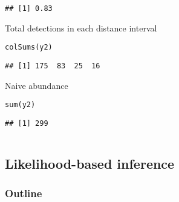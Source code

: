 \documentclass[color=usenames,dvipsnames]{beamer}\usepackage[]{graphicx}\usepackage[]{color}
\makeatletter
\newcommand{\hlstd}[1]{\textcolor[rgb]{0,0,0}{#1}}%
\newcommand{\hlkwd}[1]{\textcolor[rgb]{0.004,0.004,0.506}{#1}}%
\newenvironment{kframe}{%
 \def\at@end@of@kframe{}%
 \ifinner\ifhmode%
  \def\at@end@of@kframe{\end{minipage}}%
  \begin{minipage}{\columnwidth}%
 \fi\fi%
 \def\FrameCommand##1{\hskip\@totalleftmargin \hskip-\fboxsep
 \colorbox{shadecolor}{##1}\hskip-\fboxsep
     \hskip-\linewidth \hskip-\@totalleftmargin \hskip\columnwidth}%
 \MakeFramed {\advance\hsize-\width
   \@totalleftmargin\z@ \linewidth\hsize
   \@setminipage}}%
 {\par\unskip\endMakeFramed%
 \at@end@of@kframe}
\newenvironment{knitrout}{}{} %
\makeatother
\begin{document}
\begin{frame}[fragile]
\begin{columns}
\begin{column}{0.6\textwidth}
\begin{knitrout}
\begin{kframe}
\begin{verbatim}
## [1] 0.83
\end{verbatim}
\end{kframe}
\end{knitrout}
  \pause
  \vfill
  \small
  Total detections in each distance interval
  \vspace{-6pt}
\begin{knitrout}\scriptsize
{}\color{fgcolor}\begin{kframe}
\begin{alltt}
\hlkwd{colSums}\hlstd{(y2)}
\end{alltt}
\begin{verbatim}
## [1] 175  83  25  16
\end{verbatim}
\end{kframe}
\end{knitrout}
  \pause
  \vfill
  Naive abundance
  \vspace{-6pt}
\begin{knitrout}\scriptsize
{}\color{fgcolor}\begin{kframe}
\begin{alltt}
\hlkwd{sum}\hlstd{(y2)}
\end{alltt}
\begin{verbatim}
## [1] 299
\end{verbatim}
\end{kframe}
\end{knitrout}

  \end{column}
  \end{columns}
\end{frame}









\subsection{Likelihood-based inference}


\begin{frame}
  \frametitle{Outline}
  \Large
  \tableofcontents[currentsection]
\end{frame}
\end{document}
